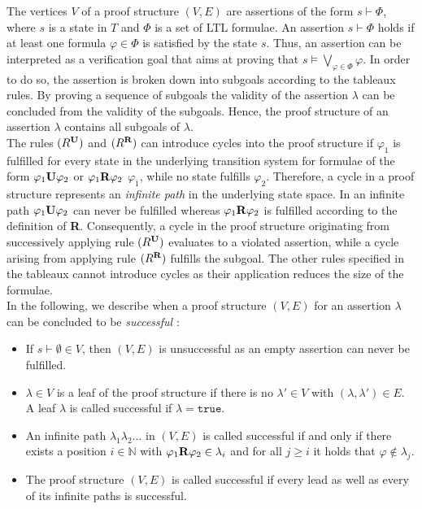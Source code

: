 \documentclass[a4paper, 12pt, twoside]{report}
\begin{document}
	The vertices $V$ of a proof structure $(V,E)$ are assertions of the form $s \vdash \Phi$, where $s$ is a state in $T$ and $\Phi$ is a set of LTL formulae. An assertion $s \vdash \Phi$ holds if at least one formula $\varphi \in \Phi$ is satisfied by the state $s$. Thus, an assertion can be interpreted as a verification goal that aims at proving that $s\models \bigvee_{\varphi \in \Phi}\varphi$. In order to do so, the assertion is broken down into subgoals according to the tableaux rules. By proving a sequence of subgoals the validity of the assertion $\lambda$ can be concluded from the validity of the subgoals. Hence, the proof structure of an assertion $\lambda$ contains all subgoals of $\lambda$. \\
	
	The rules $(R^{\text{\textbf{U}}})$ and $(R^{\text{\textbf{R}}})$ can introduce cycles into the proof structure if $\varphi_1$ is fulfilled for every state in the underlying transition system for formulae of the form $\varphi_1 \text{\textbf{U}} \varphi_2$ or $\varphi_1 \text{\textbf{R}} \varphi_2$ $\varphi_1$, while no state fulfills $\varphi_2$. Therefore, a cycle in a proof structure represents an \textit{infinite path} in the underlying state space. In an infinite path $\varphi_1 \text{\textbf{U}} \varphi_2$ can never be fulfilled whereas $\varphi_1 \text{\textbf{R}} \varphi_2$ is fulfilled according to the definition of \textbf{R}. Consequently, a cycle in the proof structure originating from successively applying rule $(R^{\text{\textbf{U}}})$ evaluates to a violated assertion, while a cycle arising from applying rule $(R^{\text{\textbf{R}}})$ fulfills the subgoal. The other rules specified in the tableaux cannot introduce cycles as their application reduces the size of the formulae. \\
	
	In the following, we describe when a proof structure $(V,E)$ for an assertion $\lambda$ can be concluded to be \textit{successful} \cite{bhat1995efficient}:
	
	\begin{itemize}
		\item If $s \vdash \emptyset \in V$, then $(V,E)$ is unsuccessful as an empty assertion can never be fulfilled.
		\item $\lambda \in V$ is a leaf of the proof structure if there is no $\lambda' \in V$ with $(\lambda, \lambda') \in E$. A leaf $\lambda$ is called successful if $\lambda = \texttt{true}$.
		\item An infinite path $\lambda_1 \lambda_2 \dots$ in $(V,E)$ is called successful if and only if there exists a position $i\in \mathds{N}$ with $\varphi_1 \text{\textbf{R}} \varphi_2 \in \lambda_i$ and for all $j \geq i$ it holds that $\varphi \notin \lambda_j$.
		\item The proof structure $(V,E)$ is called successful if every lead as well as every of its infinite paths is successful.
	\end{itemize} 
	
\end{document}
